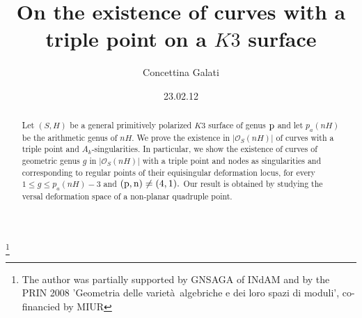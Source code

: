 \documentclass[plain]{amsart}
\def\ag{\`a}
\def\p{\rm{p}}
\begin{document}
\title[Curves with a triple point on a $K3$ surface]{On the existence of curves with a triple point on a $K3$ surface}
\author{Concettina Galati }
\address{Dipartimento di Matematica\\
 Universit\ag\, della Calabria\\
via P. Bucci, cubo 31B\\
87036 Arcavacata di Rende (CS), Italy. }

\thanks{The author was partially supported by GNSAGA of INdAM
and by the PRIN 2008 'Geometria delle variet\ag\,  algebriche e dei loro spazi di moduli', co-financied by MIUR}








\date{23.02.12}

\dedicatory{}

\commby{}


\begin{abstract}
Let $(S,H)$ be a general primitively polarized $K3$ surface 
of genus $\p$ and let  $p_a(nH)$ be the arithmetic genus of $nH.$ 
We prove the existence in $|\mathcal O_S(nH)|$ of curves
with a triple point and $A_k$-singularities. In particular, we show the existence
 of curves of geometric genus $g$  in $|\mathcal O_S(nH)|$ 
with a triple point and nodes as singularities and corresponding to regular
points of their equisingular deformation locus, for every $1\leq g\leq p_a(nH)-3$
and $(\p,n)\neq (4,1).$
Our result is obtained by studying the 
versal deformation space of a non-planar quadruple point.
\end{abstract}


\maketitle
\end{document}
